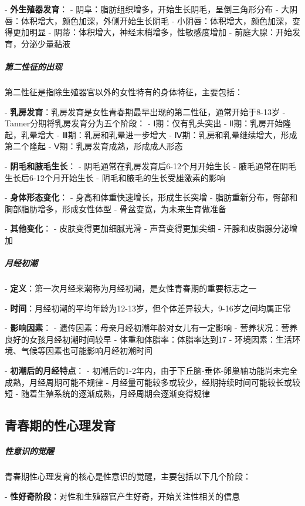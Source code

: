 \begin{enumerate}
- \textbf{外生殖器发育}：
  - 阴阜：脂肪组织增多，开始生长阴毛，呈倒三角形分布
  - 大阴唇：体积增大，颜色加深，外侧开始生长阴毛
  - 小阴唇：体积增大，颜色加深，变得更加明显
  - 阴蒂：体积增大，神经末梢增多，性敏感度增加
  - 前庭大腺：开始发育，分泌少量黏液

\subparagraph{第二性征的出现}

第二性征是指除生殖器官以外的女性特有的身体特征，主要包括：

- \textbf{乳房发育}：乳房发育是女性青春期最早出现的第二性征，通常开始于8-13岁
  - Tanner分期将乳房发育分为五个阶段：
    - Ⅰ期：仅有乳头突出
    - Ⅱ期：乳房开始隆起，乳晕增大
    - Ⅲ期：乳房和乳晕进一步增大
    - Ⅳ期：乳房和乳晕继续增大，形成第二个隆起
    - Ⅴ期：乳房发育成熟，形成成人形态

- \textbf{阴毛和腋毛生长}：
  - 阴毛通常在乳房发育后6-12个月开始生长
  - 腋毛通常在阴毛生长后6-12个月开始生长
  - 阴毛和腋毛的生长受雄激素的影响

- \textbf{身体形态变化}：
  - 身高和体重快速增长，形成生长突增
  - 脂肪重新分布，臀部和胸部脂肪增多，形成女性体型
  - 骨盆变宽，为未来生育做准备

- \textbf{其他变化}：
  - 皮肤变得更加细腻光滑
  - 声音变得更加尖细
  - 汗腺和皮脂腺分泌增加

\subparagraph{月经初潮}

- \textbf{定义}：第一次月经来潮称为月经初潮，是女性青春期的重要标志之一

- \textbf{时间}：月经初潮的平均年龄为12-13岁，但个体差异较大，9-16岁之间均属正常

- \textbf{影响因素}：
  - 遗传因素：母亲月经初潮年龄对女儿有一定影响
  - 营养状况：营养良好的女孩月经初潮时间较早
  - 体重和体脂率：体脂率达到17%
  - 环境因素：生活环境、气候等因素也可能影响月经初潮时间

- \textbf{初潮后的月经特点}：
  - 初潮后的1-2年内，由于下丘脑-垂体-卵巢轴功能尚未完全成熟，月经周期可能不规律
  - 月经量可能较多或较少，经期持续时间可能较长或较短
  - 随着生殖系统的逐渐成熟，月经周期会逐渐变得规律

\subsection{青春期的性心理发育}

\subparagraph{性意识的觉醒}

青春期性心理发育的核心是性意识的觉醒，主要包括以下几个阶段：

- \textbf{性好奇阶段}：对性和生殖器官产生好奇，开始关注性相关的信息


\end{enumerate}
